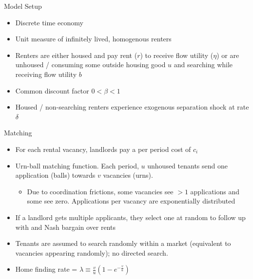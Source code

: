 \documentclass[10pt, xcolor=dvipsnames]{beamer}
\begin{document}
\begin{frame}{Model Setup}
    \begin{itemize}
    \item Discrete time economy
    \item Unit measure of infinitely lived, homogenous renters
    \item Renters are either housed and pay rent ($r$) to receive flow utility (\textbf{$\eta$}) or are unhoused / consuming some outside housing good \textbf{$u$} and searching while receiving flow utility \textbf{$b$}
    \item Common discount factor \textbf{$0 < \beta < 1$}
    \item Housed / non-searching renters experience exogenous separation shock at rate \textbf{$\delta$}
\end{itemize}
\end{frame}

\begin{frame}{Matching}
    \begin{itemize}
    \item For each rental vacancy, landlords pay a per period cost of \textbf{$c_i$}
    \item Urn-ball matching function. Each period, \textbf{$u$} unhoused tenants send one application (balls) towards \textbf{$v$} vacancies (urns).
    \begin{itemize}
        \item Due to coordination frictions, some vacancies see $>1$ applications and some see zero. Applications per vacancy are exponentially distributed
    \end{itemize}
    \item If a landlord gets multiple applicants, they select one at random to follow up with and Nash bargain over rents
        
    \item Tenants are assumed to search randomly within a market (equivalent to vacancies appearing randomly); no directed search.
    \item Home finding rate = \textbf{$\lambda \equiv \frac{v}{u}(1-e^{-\frac{v}{u}})$}
\end{itemize}
\end{frame}
\end{document}

